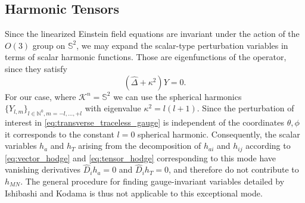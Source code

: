 \documentclass[11pt,aip,jmp,amsmath,amssymb,draft]{revtex4-1}
\begin{document}
\subsection{Harmonic Tensors}
Since the linearized Einstein field equations are invariant under the action of the $O(3)$ group on $\mathbb S^2$, we may expand the scalar-type perturbation variables in terms of scalar harmonic functions. Those are eigenfunctions of the operator, since they satisfy
\begin{equation}
    (\hat \Delta + \kappa^2) Y = 0.
\end{equation}
For our case, where $\mathcal K^n = \mathbb S^2$ we can use the spherical harmonics $\{Y_{l,m}\}_{l\in \mathbb N^0, m=-l, \dots, +l}$ with eigenvalue $\kappa^2 = l(l+1)$.
Since the perturbation of interest in \cref{eq:transverse_traceless_gauge} is independent of the coordinates $\theta,\phi$ it corresponds to the constant $l=0$ spherical harmonic.
Consequently, the scalar variables $h_a$ and $h_T$ arising from the decomposition of $h_{ai}$ and $h_{ij}$ according to \cref{eq:vector_hodge} and \cref{eq:tensor_hodge} corresponding to this mode have vanishing derivatives $\hat D_ih_a = 0$ and $\hat D_ih_T=0$, and therefore do not contribute to $h_{MN}$. 
The general procedure for finding gauge-invariant variables detailed by Ishibashi and Kodama \cite{ishibashi2011perturbations} is thus not applicable to this exceptional mode.
\end{document}
